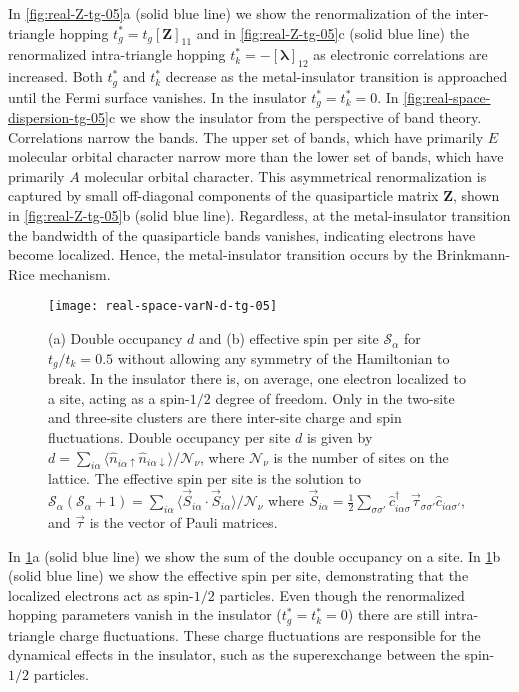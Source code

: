 \documentclass[reprint,aps,prb,amsmath,amssymb]{revtex4-2}
\begin{document}
In \cref{fig:real-Z-tg-05}a (solid blue line) we show the renormalization of the inter-triangle hopping $t_g^* = t_g [\bm{Z}]_{11}$ and in \cref{fig:real-Z-tg-05}c (solid blue line) the renormalized intra-triangle hopping $t_k^* = -[\bm{\lambda}]_{12}$ as electronic correlations are increased. Both $t_g^*$ and $t_k^*$ decrease as the metal-insulator transition is approached until the Fermi surface vanishes. In the insulator $t_g^* = t_k^* = 0$. In \cref{fig:real-space-dispersion-tg-05}c we show the insulator from the perspective of band theory. Correlations narrow the bands. The upper set of bands, which have primarily $E$ molecular orbital character \cite{Nourse2021a,Nourse2021b} narrow more than the lower set of bands, which have primarily $A$ molecular orbital character. This asymmetrical renormalization is captured by small off-diagonal components of the quasiparticle matrix $\bm{Z}$, shown in \cref{fig:real-Z-tg-05}b (solid blue line). Regardless, at the metal-insulator transition the bandwidth of the quasiparticle bands vanishes, indicating electrons have become localized. Hence, the metal-insulator transition occurs by the Brinkmann-Rice mechanism.

\begin{figure}
	\centering
	\texttt{[image: real-space-varN-d-tg-05]}
	\caption
	{\label{fig:para-d-s}
		(a) Double occupancy $d$ and (b) effective spin per site $\mathcal{S}_{\alpha}$ for $t_g/t_k = 0.5$ without allowing any symmetry of the Hamiltonian to break.
		In the insulator there is, on average, one electron localized to a site, acting as a spin-$1/2$ degree of freedom. Only in the two-site and three-site clusters are there inter-site charge and spin fluctuations.
		Double occupancy per site $d$ is given by $d = \sum_{i\alpha} \langle \hat{n}_{i\alpha \uparrow} \hat{n}_{i\alpha \downarrow} \rangle / \mathcal{N}_{\nu}$, where $\mathcal{N}_{\nu}$ is the number of sites on the lattice.
		The effective spin per site is the solution to $\mathcal{S}_{\alpha}(\mathcal{S}_{\alpha} + 1) = \sum_{i\alpha} \langle \vec{S}_{i \alpha} \cdot \vec{S}_{i\alpha} \rangle / \mathcal{N}_{\nu}$ where $\vec{S}_{i\alpha} = \frac{1}{2} \sum_{\sigma \sigma'} \hat{c}_{i\alpha\sigma}^{\dagger} \vec{\tau}_{\sigma \sigma'} \hat{c}_{i\alpha\sigma'}^{}$, and $\vec{\tau}$ is the vector of Pauli matrices.
	}
\end{figure}

In \cref{fig:para-d-s}a (solid blue line) we show the sum of the double occupancy on a site.  In \cref{fig:para-d-s}b (solid blue line) we show the effective spin per site, demonstrating that the localized electrons act as spin-$1/2$ particles. Even though the renormalized hopping parameters vanish in the insulator ($t_g^* = t_k^* = 0$) there are still intra-triangle charge fluctuations. These charge fluctuations are responsible for the dynamical effects in the insulator, such as the superexchange between the spin-$1/2$ particles.
\end{document}
